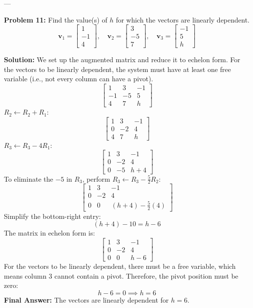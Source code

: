 \documentclass[11pt]{article}
\begin{document}
---

\textbf{Problem 11:} Find the value(s) of $h$ for which the vectors are linearly dependent.
\[ \mathbf{v}_1 = \begin{bmatrix} 1 \\ -1 \\ 4 \end{bmatrix}, \quad \mathbf{v}_2 = \begin{bmatrix} 3 \\ -5 \\ 7 \end{bmatrix}, \quad \mathbf{v}_3 = \begin{bmatrix} -1 \\ 5 \\ h \end{bmatrix} \]

\textbf{Solution:}
We set up the augmented matrix and reduce it to echelon form. For the vectors to be linearly dependent, the system must have at least one free variable (i.e., not every column can have a pivot).
\[
\begin{bmatrix}
1 & 3 & -1 \\
-1 & -5 & 5 \\
4 & 7 & h
\end{bmatrix}
\]
$R_2 \leftarrow R_2 + R_1$:
\[
\begin{bmatrix}
1 & 3 & -1 \\
0 & -2 & 4 \\
4 & 7 & h
\end{bmatrix}
\]
$R_3 \leftarrow R_3 - 4R_1$:
\[
\begin{bmatrix}
1 & 3 & -1 \\
0 & -2 & 4 \\
0 & -5 & h+4
\end{bmatrix}
\]
To eliminate the $-5$ in $R_3$, perform $R_3 \leftarrow R_3 - \frac{5}{2}R_2$:
\[
\begin{bmatrix}
1 & 3 & -1 \\
0 & -2 & 4 \\
0 & 0 & (h+4) - \frac{5}{2}(4)
\end{bmatrix}
\]
Simplify the bottom-right entry:
\[ (h+4) - 10 = h - 6 \]
The matrix in echelon form is:
\[
\begin{bmatrix}
1 & 3 & -1 \\
0 & -2 & 4 \\
0 & 0 & h-6
\end{bmatrix}
\]
For the vectors to be linearly dependent, there must be a free variable, which means column 3 cannot contain a pivot. Therefore, the pivot position must be zero:
\[ h - 6 = 0 \implies h = 6 \]
\textbf{Final Answer:} The vectors are linearly dependent for $h = 6$.
\end{document}
